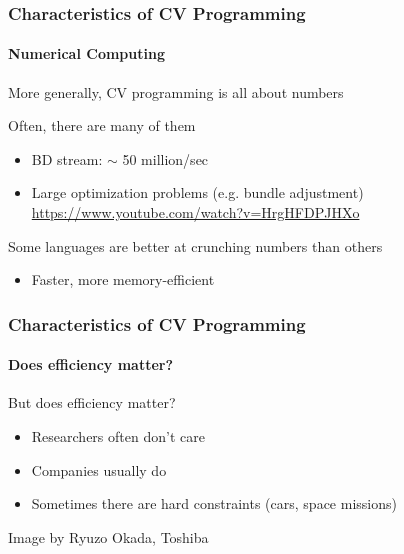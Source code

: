 \documentclass[xetex,professionalfont]{beamer}
\newcommand{\eg}{\mbox{e.g.}\xspace} %
\begin{document}
\begin{frame}
\frametitle{Characteristics of CV Programming}
\framesubtitle{Numerical Computing}

More generally, CV programming is all about numbers

\bigskip
Often, there are many of them
\begin{itemize}
	\item BD stream: $\sim$ 50 million/sec %
	\item Large optimization problems (\eg bundle adjustment) \\ \url{https://www.youtube.com/watch?v=HrgHFDPJHXo}
\end{itemize}

\bigskip
Some languages are better at crunching numbers than others
\begin{itemize}
	\item Faster, more memory-efficient
\end{itemize}

\end{frame}


\begin{frame}
\frametitle{Characteristics of CV Programming}
\framesubtitle{Does efficiency matter?}

But does efficiency matter?
\begin{itemize}
	\item Researchers often don't care %
	\item Companies usually do %
	\item Sometimes there are hard constraints (cars, space missions)
\end{itemize}

\medskip
\begin{center}
	{\centering Image by Ryuzo Okada, Toshiba}
\end{center}

\end{frame}
\end{document}
